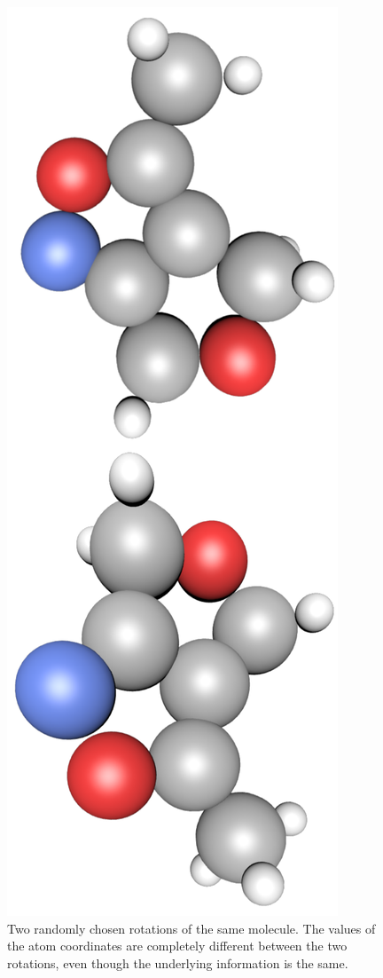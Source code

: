 \begin{figure}[H]
	\centering
	\includegraphics[angle=270, width=\linewidth]{figures/rotation}
	\caption{Two randomly chosen rotations of the same molecule. The values of the atom coordinates are completely different between the two rotations, even though the underlying information is the same.}
	\label{fig:rotation}
\end{figure}

